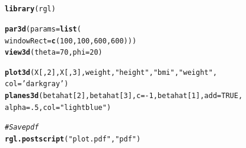 \documentclass[11pt]{article}\usepackage[]{graphicx}\usepackage[]{color}
\makeatletter
\newcommand{\hlnum}[1]{\textcolor[rgb]{0.686,0.059,0.569}{#1}}%
\newcommand{\hlstr}[1]{\textcolor[rgb]{0.192,0.494,0.8}{#1}}%
\newcommand{\hlcom}[1]{\textcolor[rgb]{0.678,0.584,0.686}{\textit{#1}}}%
\newcommand{\hlopt}[1]{\textcolor[rgb]{0,0,0}{#1}}%
\newcommand{\hlstd}[1]{\textcolor[rgb]{0.345,0.345,0.345}{#1}}%
\newcommand{\hlkwc}[1]{\textcolor[rgb]{0.333,0.667,0.333}{#1}}%
\newcommand{\hlkwd}[1]{\textcolor[rgb]{0.737,0.353,0.396}{\textbf{#1}}}%
\newenvironment{kframe}{%
 \def\at@end@of@kframe{}%
 \ifinner\ifhmode%
  \def\at@end@of@kframe{\end{minipage}}%
  \begin{minipage}{\columnwidth}%
 \fi\fi%
 \def\FrameCommand##1{\hskip\@totalleftmargin \hskip-\fboxsep
 \colorbox{shadecolor}{##1}\hskip-\fboxsep
     \hskip-\linewidth \hskip-\@totalleftmargin \hskip\columnwidth}%
 \MakeFramed {\advance\hsize-\width
   \@totalleftmargin\z@ \linewidth\hsize
   \@setminipage}}%
 {\par\unskip\endMakeFramed%
 \at@end@of@kframe}
\newenvironment{knitrout}{}{} %
\makeatother
\begin{document}
\section{}

\begin{knitrout}
\color{fgcolor}\begin{kframe}
\begin{alltt}
\hlkwd{library}\hlstd{(rgl)}

\hlkwd{par3d}\hlstd{(}\hlkwc{params}\hlstd{=}\hlkwd{list}\hlstd{(}
  \hlkwc{windowRect}\hlstd{=}\hlkwd{c}\hlstd{(}\hlnum{100}\hlstd{,}\hlnum{100}\hlstd{,}\hlnum{600}\hlstd{,}\hlnum{600}\hlstd{)))}
\hlkwd{view3d}\hlstd{(} \hlkwc{theta} \hlstd{=} \hlnum{70}\hlstd{,} \hlkwc{phi} \hlstd{=} \hlnum{20}\hlstd{)}

\hlkwd{plot3d}\hlstd{(X[,}\hlnum{2}\hlstd{],X[,}\hlnum{3}\hlstd{],weight,}\hlstr{"height"}\hlstd{,}\hlstr{"bmi"}\hlstd{,}\hlstr{"weight"}\hlstd{,}
       \hlkwc{col}\hlstd{=}\hlstr{'darkgray'}\hlstd{)}
\hlkwd{planes3d}\hlstd{(betahat[}\hlnum{2}\hlstd{],betahat[}\hlnum{3}\hlstd{],}\hlkwc{c}\hlstd{=}\hlopt{-}\hlnum{1}\hlstd{,betahat[}\hlnum{1}\hlstd{],}\hlkwc{add}\hlstd{=}\hlnum{TRUE}\hlstd{,}
         \hlkwc{alpha}\hlstd{=}\hlnum{.5}\hlstd{,}\hlkwc{col}\hlstd{=}\hlstr{"lightblue"}\hlstd{)}

\hlcom{# Save pdf}
\hlkwd{rgl.postscript}\hlstd{(}\hlstr{"plot.pdf"}\hlstd{,}\hlstr{"pdf"}\hlstd{)}
\end{alltt}
\end{kframe}
\end{knitrout}


\section{}
\end{document}
